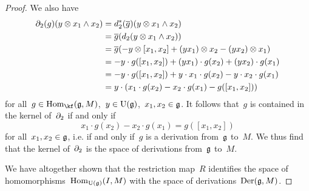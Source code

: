 \begin{proof}
  We also have
  \begin{align*}
    \partial_2(g)(y \otimes x_1 \wedge x_2)
    &=
    d_2^*(\overline{g})(y \otimes x_1 \wedge x_2)
    \\
    &=
    \overline{g}( d_2( y \otimes x_1 \wedge x_2 ) )
    \\
    &=
    \overline{g}
    (
      - y \otimes [x_1, x_2]
      + (y x_1) \otimes x_2
      - (y x_2) \otimes x_1
    )
    \\
    &=
    - y \cdot g([x_1, x_2])
    + (y x_1) \cdot g(x_2)
    + (y x_2) \cdot g(x_1)
    \\
    &=
    - y \cdot g([x_1, x_2])
    + y \cdot x_1 \cdot g(x_2)
    - y \cdot x_2 \cdot g(x_1)
    \\
    &=
    y \cdot
    (
      x_1 \cdot g(x_2) - x_2 \cdot g(x_1) - g([x_1, x_2])
    ) 
  \end{align*}
  for all~$g \in \Hom_{\kf}(\glie, M)$,~$y \in \operatorname{U}(\mathfrak{g})$,~$x_1, x_2 \in \mathfrak{g}$.
  It follows that~$g$ is contained in the kernel of~$\partial_2$ if and only if
  \[
    x_1 \cdot g(x_2) - x_2 \cdot g(x_1)
    =
    g([x_1, x_2])
  \]
  for all~$x_1, x_2 \in \mathfrak{g}$, i.e. if and only if~$g$ is a derivation from~$\mathfrak{g}$ to~$M$.
  We thus find that the kernel of~$\partial_2$ is the space of derivations from~$\mathfrak{g}$ to~$M$.

  We have altogether shown that the restriction map~$R$ identifies the space of homomorphisms~$\operatorname{Hom}_{\operatorname{U}(\mathfrak{g})}(I, M)$ with the space of derivations~$\operatorname{Der}(\mathfrak{g}, M)$.
\end{proof}


